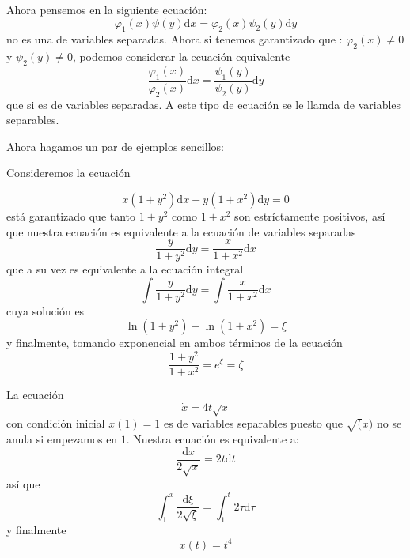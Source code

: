 Ahora pensemos en la siguiente ecuación:
$$
\varphi_1(x)\psi(y)\mathrm{d}x=\varphi_2(x)\psi_2(y)\mathrm{d}y
$$
no es una de variables separadas. Ahora si tenemos garantizado que : $\varphi_2(x)\neq 0$ y $\psi_2(y)\neq 0$, podemos  considerar la ecuación equivalente
$$
\frac{\varphi_1(x)}{\varphi_2(x)}\mathrm{d}x=\frac{\psi_1(y)}{\psi_2(y)}\mathrm{d}y
$$
que si es de variables separadas. A este tipo de ecuación se le llamda de variables separables.

Ahora hagamos un par de ejemplos sencillos:

\begin{ejemplo}
Consideremos la ecuación

$$
x(1+y^2)\mathrm{d}x-y(1+x^2)\mathrm{d}y=0
$$
está garantizado que  tanto $1+y^2$ como $1+x^2$ son estríctamente positivos, así que nuestra ecuación es equivalente a la ecuación de variables separadas
$$
\frac{y}{1+y^2}\mathrm{d}y=\frac{x}{1+x^2}\mathrm{d}x
$$
que a su vez es equivalente a la ecuación integral
$$
\int \frac{y}{1+y^2}\mathrm{d}y=\int \frac{x}{1+x^2}\mathrm{d}x
$$
cuya solución es 
$$
\ln(1+y^2)-\ln(1+x^2)=\xi
$$
y finalmente, tomando exponencial en ambos términos de la ecuación
$$
\frac{1+y^2}{1+x^2}=e^{\xi}=\zeta
$$
\end{ejemplo}

\begin{ejemplo}
La ecuación
$$
\dot{x}=4t\sqrt{x}
$$
con condición inicial $x(1)=1$ es de variables separables puesto que $\sqrt(x)$ no se anula si empezamos en $1$. Nuestra ecuación es equivalente a:
$$
\frac{\mathrm{d}x}{2\sqrt{x}}=2t\mathrm{d}t
$$
así que
$$
\int_{1}^{x}\frac{\mathrm{d}\xi}{2\sqrt{\xi}}=\int_{1}^{t}2\tau\mathrm{d}\tau
$$
y finalmente
$$
x(t)=t^4
$$
\end{ejemplo}